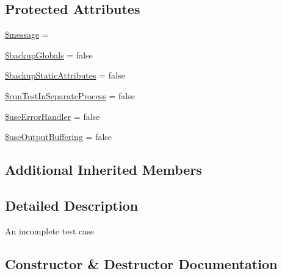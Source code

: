 \subsection*{Protected Attributes}
\begin{DoxyCompactItemize}
\item 
\mbox{\hyperlink{class_p_h_p_unit___framework___incomplete_test_case_abf17cb2dba2ed17cb28aa5f37deb5293}{\$message}} = \textquotesingle{}\textquotesingle{}
\item 
\mbox{\hyperlink{class_p_h_p_unit___framework___incomplete_test_case_a7c6af4e36636a61ec139a77a1c07cffe}{\$backup\+Globals}} = false
\item 
\mbox{\hyperlink{class_p_h_p_unit___framework___incomplete_test_case_a563497416305ba3d1caeb0dbe4454bb3}{\$backup\+Static\+Attributes}} = false
\item 
\mbox{\hyperlink{class_p_h_p_unit___framework___incomplete_test_case_a7e113cd6fbfe94d18fe43cf7bbd0f899}{\$run\+Test\+In\+Separate\+Process}} = false
\item 
\mbox{\hyperlink{class_p_h_p_unit___framework___incomplete_test_case_a68c36deb5af7e39a2c8af018224eaa4d}{\$use\+Error\+Handler}} = false
\item 
\mbox{\hyperlink{class_p_h_p_unit___framework___incomplete_test_case_ab15400de1ea7083389dec5da0b0a1845}{\$use\+Output\+Buffering}} = false
\end{DoxyCompactItemize}
\subsection*{Additional Inherited Members}


\subsection{Detailed Description}
An incomplete test case 

\subsection{Constructor \& Destructor Documentation}
\mbox{\label{class_p_h_p_unit___framework___incomplete_test_case_afe6b924c0b9ead28b232f6860fc50236}} 
